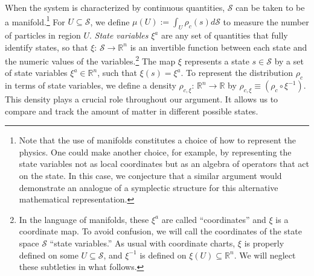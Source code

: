\documentclass[12pt, twoside]{article}
\begin{document}


When the system is characterized by continuous quantities, $\mathcal{S}$ can be taken to be a manifold.\footnote{Note that the use of manifolds constitutes a choice of how to represent the physics. One could make another choice, for example, by representing the state variables not as local coordinates but as an algebra of operators that act on the state. In this case, we conjecture that a similar argument would demonstrate an analogue of a symplectic structure for this alternative mathematical representation.} For $U \subseteq \mathcal{S}$, we define $\mu(U) := \int_U \rho_c(s) d\mathcal{S}$ to measure the number of particles in region $U$. \textit{State variables} $\xi^a$ are any set of quantities that fully identify states, so that $\xi$: $\mathcal{S} \to \mathbb{R}^n$ is an invertible function between each state and the numeric values of the variables.\footnote{In the language of manifolds, these $\xi^a$ are called ``coordinates'' and $\xi$ is a coordinate map. To avoid confusion, we will call the coordinates of the state space $\mathcal{S}$ ``state variables.'' As usual with coordinate charts, $\xi$ is properly defined on some $U \subseteq \mathcal{S}$, and $\xi^{-1}$ is defined on $\xi(U) \subseteq \mathbb{R}^n$. We will neglect these subtleties in what follows.} The map $\xi$ represents a state $s \in \mathcal{S}$ by a set of state variables $\xi^a \in \mathbb{R}^n$, such that $\xi (s) = \xi^a$. To represent the distribution $\rho_c$ in terms of state variables, we define a density $\rho_{c, \xi}$: $\mathbb{R}^n \to \mathbb{R}$ by $\rho_{c, \xi} \equiv (\rho_c \circ \xi^{-1})$. This density plays a crucial role throughout our argument. It allows us to compare and track the amount of matter in different possible states.
\end{document}
